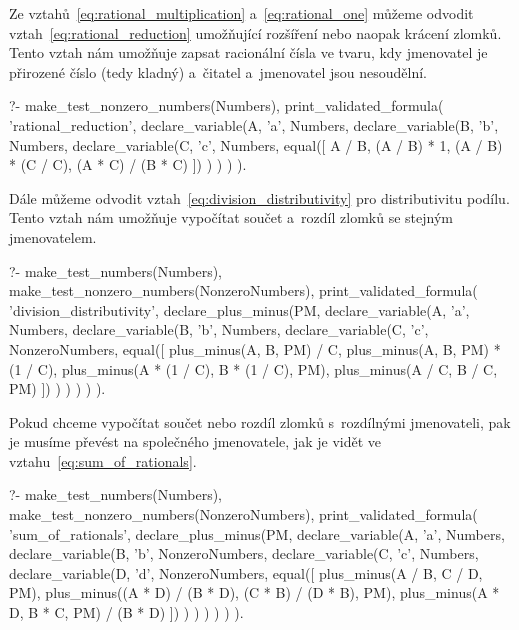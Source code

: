 Ze vztahů~\eqref{eq:rational_multiplication} a~\eqref{eq:rational_one} můžeme odvodit vztah~\eqref{eq:rational_reduction} umožňující rozšíření nebo naopak krácení zlomků. Tento vztah nám umožňuje zapsat racionální čísla ve tvaru, kdy jmenovatel je přirozené číslo (tedy kladný) a~čitatel a~jmenovatel jsou nesoudělní.

\begin{prolog}
?-	make_test_nonzero_numbers(Numbers),
	print_validated_formula(
		'rational_reduction',
		declare_variable(A, 'a', Numbers,
			declare_variable(B, 'b', Numbers,
				declare_variable(C, 'c', Numbers,
					equal([
						A / B,
						(A / B) * 1,
						(A / B) * (C / C),
						(A * C) / (B * C)
					])
				)
			)
		)
	).
\end{prolog}

Dále můžeme odvodit vztah~\eqref{eq:division_distributivity} pro distributivitu podílu. Tento vztah nám umožňuje vypočítat součet a~rozdíl zlomků se stejným jmenovatelem.

\begin{prolog}
?-	make_test_numbers(Numbers),
	make_test_nonzero_numbers(NonzeroNumbers),
	print_validated_formula(
		'division_distributivity',
		declare_plus_minus(PM,
			declare_variable(A, 'a', Numbers,
				declare_variable(B, 'b', Numbers,
					declare_variable(C, 'c', NonzeroNumbers,
						equal([
							plus_minus(A, B, PM) / C,
							plus_minus(A, B, PM) * (1 / C),
							plus_minus(A * (1 / C), B * (1 / C), PM),
							plus_minus(A / C, B / C, PM)
						])
					)
				)
			)
		)
	).
\end{prolog}

Pokud chceme vypočítat součet nebo rozdíl zlomků s~rozdílnými jmenovateli, pak je musíme převést na společného jmenovatele, jak je vidět ve vztahu~\eqref{eq:sum_of_rationals}.

\begin{prolog}
?-	make_test_numbers(Numbers),
	make_test_nonzero_numbers(NonzeroNumbers),
	print_validated_formula(
		'sum_of_rationals',
		declare_plus_minus(PM,
			declare_variable(A, 'a', Numbers,
				declare_variable(B, 'b', NonzeroNumbers,
					declare_variable(C, 'c', Numbers,
						declare_variable(D, 'd', NonzeroNumbers,
							equal([
								plus_minus(A / B, C / D, PM),
								plus_minus((A * D) / (B * D), (C * B) / (D * B), PM),
								plus_minus(A * D, B * C, PM) / (B * D)
							])
						)
					)
				)
			)
		)
	).
\end{prolog}

